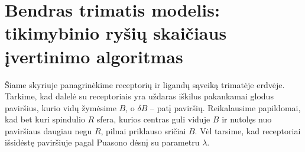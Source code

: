 \documentclass[10pt]{article}
\begin{document}


  


\section{Bendras trimatis modelis: tikimybinio ryšių skaičiaus įvertinimo algoritmas}

Šiame skyriuje panagrinėkime receptorių ir ligandų sąveiką trimatėje erdvėje. Tarkime, kad dalelė su receptoriais yra uždaras iškilus pakankamai glodus paviršius, kurio vidų žymėsime $ B $, o $ \delta B  $ -- patį paviršių. Reikalausime papildomai, kad bet kuri  spindulio $R$ sfera, kurios centras guli viduje $ B $ ir nutolęs nuo  paviršiaus daugiau negu $ R $, pilnai priklauso sričiai $ B $.  Vėl tarsime, kad receptoriai išsidėstę paviršiuje  pagal Puasono dėsnį su parametru $ \lambda $.
\end{document}
